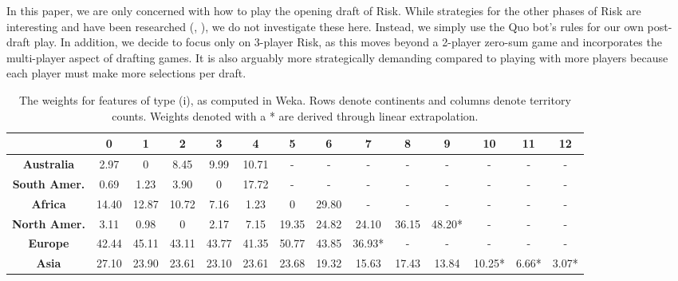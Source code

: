 \documentclass[letterpaper]{article}
\numberwithin{equation}{section}
\numberwithin{theorem}{section}
\numberwithin{lemma}{section}
\numberwithin{df}{section}
\begin{document}
In this paper, we are only concerned with how to play the opening draft of Risk.  While strategies for the other phases of Risk are interesting and have been researched (\cite{RiskBots}, \cite{ZuckFelnerKraus2009}), we do not investigate these here.  Instead, we simply use the Quo bot's rules for our own post-draft play.  In addition, we decide to focus only on 3-player Risk, as this moves beyond a 2-player zero-sum game and incorporates the multi-player aspect of drafting games.  It is also arguably more strategically demanding compared to playing with more players because each player must make more selections per draft.

\begin{table}[t]
 \centering
      \caption{The weights for features of type (i), as computed in Weka.  Rows denote continents and columns denote territory counts.  Weights denoted with a * are derived through linear extrapolation.}
    \label{tab:ContScoring}
    \begin{footnotesize}
    \begin{tabular}{|c|c|c|c|c|c|c|c|c|c|c|c|c|c|}
    	\hline
    	  & \bf 0 & \bf 1 & \bf 2  & \bf 3 & \bf 4 & \bf 5 & \bf 6 & \bf 7 & \bf 8 & \bf 9 & \bf 10 & \bf 11 & \bf 12 \\
    	 \hline
    	\bf Australia & 2.97 & 0 & 8.45 & 9.99 & 10.71 & - & - & - & - & - & - & - & - \\
    	\hline
    	\bf South Amer. & 0.69 & 1.23 & 3.90 & 0 & 17.72 & - & - & - & - & - & - & - & - \\
    	\hline
    	\bf Africa & 14.40 & 12.87 & 10.72 & 7.16 & 1.23 & 0 & 29.80 & - & - & - & - & - & - \\
    	\hline
    	\bf North Amer. & 3.11 & 0.98 & 0 & 2.17 & 7.15 & 19.35 & 24.82 & 24.10 & 36.15 & 48.20* & - & - & - \\
    	\hline
    	\bf Europe & 42.44 & 45.11 & 43.11 & 43.77 & 41.35 & 50.77 & 43.85 & 36.93* & - & - & - & - & - \\
    	\hline
    	\bf Asia & 27.10 & 23.90 & 23.61 & 23.10 & 23.61 & 23.68 & 19.32 & 15.63 & 17.43 & 13.84 & 10.25* & 6.66* & 3.07* \\
    	\hline
    \end{tabular}
    \end{footnotesize}
\end{table}
\end{document}
